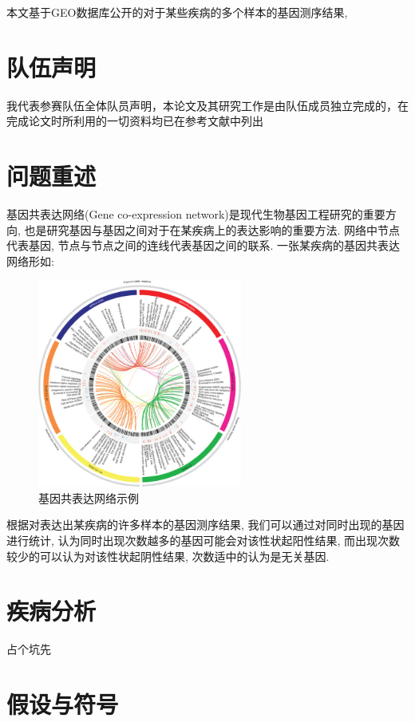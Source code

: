 \documentclass[zihao=-4]{ctexart}
\begin{document}
本文基于GEO数据库公开的对于某些疾病的多个样本的基因测序结果, 


\newpage

\section*{队伍声明}

我代表参赛队伍全体队员声明，本论文及其研究工作是由队伍成员独立完成的，在完成论文时所利用的一切资料均已在参考文献中列出 
\newpage
\tableofcontents

\section{问题重述}
基因共表达网络(Gene co-expression network)是现代生物基因工程研究的重要方向, 也是研究基因与基因之间对于在某疾病上的表达影响的重要方法. 网络中节点代表基因, 节点与节点之间的连线代表基因之间的联系. 一张某疾病的基因共表达网络形如:
\begin{figure}[H]
    \centering
    \includegraphics[width=0.6\textwidth]{pic/example.jpg}
    \caption{基因共表达网络示例\cite{example}}
\end{figure}

根据对表达出某疾病的许多样本的基因测序结果, 我们可以通过对同时出现的基因进行统计, 认为同时出现次数越多的基因可能会对该性状起阳性结果, 而出现次数较少的可以认为对该性状起阴性结果, 次数适中的认为是无关基因.

\section{疾病分析}
占个坑先

\section{假设与符号}
\end{document}
